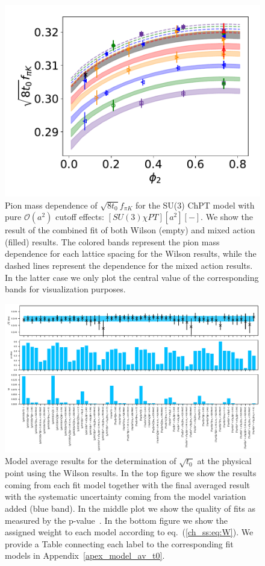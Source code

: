 \begin{figure}
    \centering
    \includegraphics[width=1.\textwidth]{./cap5/figs/SU3_only_comb.pdf}
    \caption{Pion mass dependence of $\sqrt{8t_0}f_{\pi K}$ for the SU(3) ChPT model with pure $\mathcal{O}(a^2)$ cutoff effects: $[SU(3)\chi PT][a^2][-]$. We show the result of the combined fit of both Wilson (empty) and mixed action (filled) results. The colored bands represent the pion mass dependence for each lattice spacing for the Wilson results, while the dashed lines represent the dependence for the mixed action results. In the latter case we only plot the central value of the corresponding bands for visualization purposes.}
    \label{ch_ss:fig:SU3a2}
\end{figure}

\begin{figure}
    \centering
    \includegraphics[width=1.\textwidth]{./cap5/figs/BMA_w.pdf}
    \caption{Model average results for the determination of $\sqrt{t_0}$ at the physical point using the Wilson results. In the top figure we show the results coming from each fit model together with the final averaged result with the systematic uncertainty coming from the model variation added (blue band). In the middle plot we show the quality of fits as measured by the p-value~\cite{chi_exp}. In the bottom figure we show the assigned weight to each model according to eq.~(\ref{ch_ss:eq:W}). We provide a Table connecting each label to the corresponding fit models in Appendix~\ref{apex_model_av_t0}.}
    \label{ch_ss:fig:BMA_w}
\end{figure}

